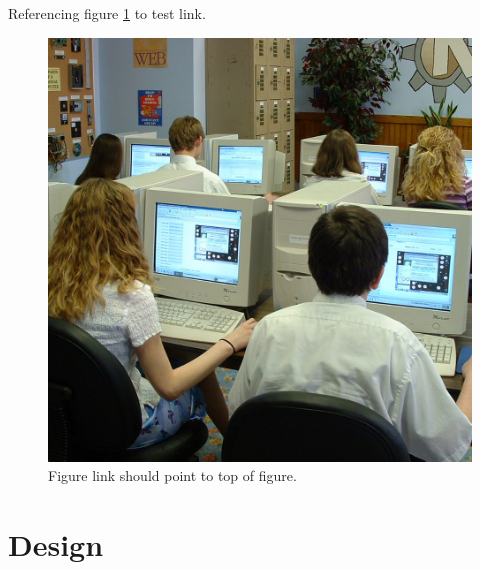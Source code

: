 \documentclass[final,11pt,baselinegrid]{../../uit-thesis}
\begin{document}
Referencing figure \ref{fig:ex} to test link.

\begin{figure}\label{fig:ex}
\centering
\includegraphics[scale=0.1]{748443511_095ae916df_o.jpg}
\caption{Figure link should point to top of figure.}
\end{figure}

\chapter{Design}
\lipsum[8-10]

\backmatter
\end{document}
